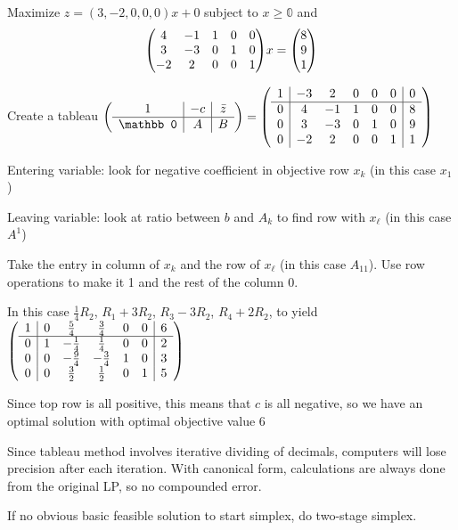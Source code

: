 \begin{example}
  Maximize $z = (3,-2,0,0,0)x+0$ subject to
  $x \geq \mathbb0$ and
  \[\mqty(\mqty{4&-1\\3&-3\\-2&2}&\mqty{\imat{3}})x = \mqty(8\\9\\1)\]
\end{example}
\begin{sol}
  Create a tableau
  $\qty(\begin{array}{c|c|c}1 & -c& \bar z \\ \hline \mathbb0 & A & B\end{array}) = \qty(\begin{array}{c|ccccc|c}1&-3&2&0&0&0&0 \\\hline 0&4&-1&1&0&0&8 \\ 0&3&-3&0&1&0&9 \\ 0&-2&2&0&0&1&1 \end{array})$

  Entering variable: look for negative coefficient in objective row
  $x_k$ (in this case $x_1$)

  Leaving variable: look at ratio between $b$ and $A_k$ to find
  row with $x_\ell$ (in this case $A^1$)

  Take the entry in column of $x_k$ and the row of $x_\ell$
  (in this case $A_{11}$).
  Use row operations to make it 1 and the rest of the column 0.

  In this case $\frac14R_2$, $R_1 + 3R_2$, $R_3 - 3R_2$,
  $R_4 + 2R_2$, to yield
  $\qty(\begin{array}{c|ccccc|c}1&0&\frac54&\frac34&0&0&6 \\\hline 0&1&-\frac14&\frac14&0&0&2 \\ 0&0&-\frac94&-\frac34&1&0&3 \\ 0&0&\frac32&\frac12&0&1&5 \end{array})$

  Since top row is all positive, this means that $c$ is all
  negative, so we have an optimal solution with optimal
  objective value 6
\end{sol}

Since tableau method involves iterative dividing of decimals,
computers will lose precision after each iteration. With canonical
form, calculations are always done from the original LP, so no
compounded error.

If no obvious basic feasible solution to start simplex, do two-stage
simplex.

